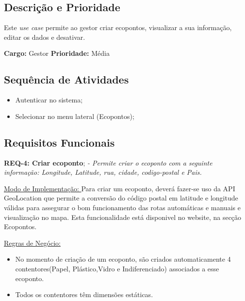 \documentclass{scrreprt}
\begin{document}
	\subsection{Descrição e Prioridade}
	Este \textit{use case} permite ao gestor criar ecopontos, visualizar a sua informação, editar os dados e desativar.
	
	\textbf{Cargo: }Gestor  \newline
	\textbf{Prioridade: }Média \newline
	
	\subsection{Sequência de Atividades}
	
	\begin{itemize}
		\item Autenticar no sistema;
		\item Selecionar no menu lateral (Ecopontos);
	\end{itemize}
	
	\subsection{Requisitos Funcionais}
	\textbf{REQ-4: Criar ecoponto};\newline
	\textit{- Permite criar o ecoponto com a seguinte informação: Longitude, Latitude, rua, cidade, codigo-postal e Pais.}\newline\newline

		\underline{Modo de Implementação: }Para criar um ecoponto, deverá fazer-se uso da API GeoLocation que permite a conversão do código postal em latitude e longitude válidas para assegurar o bom funcionamento das rotas automáticas e manuais e visualização no mapa. Esta funcionalidade está disponivel no website, na secção Ecopontos.\newline\newline
		
		\underline{Regras de Negócio: } 
		\begin{itemize}
		\item No momento de criação de um ecoponto, são criados automaticamente 4 contentores(Papel, Plástico,Vidro e Indiferenciado) associados a esse ecoponto.
    	\item Todos os contentores têm dimensões estáticas.
    	\end{itemize}
    	
\end{document}
